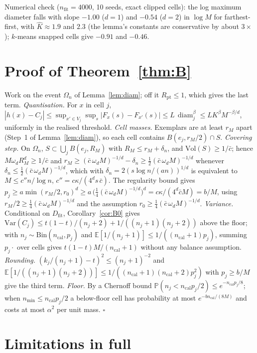 \documentclass[twoside]{article}
\theoremstyle{definition}
\theoremstyle{remark}
\newcommand{\Dfit}{D_{\mathrm{fit}}}
\newcommand{\E}{\mathbb{E}}
\renewcommand{\P}{\mathbb{P}}
\newcommand{\1}{\mathbf{1}}
\DeclareMathOperator{\diam}{diam}
\begin{document}
Numerical check ($n_{\mathrm{fit}}=4000$, 10 seeds, exact clipped
cells): the log maximum diameter falls with slope $-1.00$ ($d=1$) and $-0.54$ ($d=2$) in $\log M$
for farthest-first, with $\hat K\approx1.9$ and $2.3$ (the lemma's constants are conservative by
about $3\times$); $k$-means snapped cells give $-0.91$ and $-0.46$.

\section{Proof of Theorem~\ref{thm:B}}
\label{app:thmB}
Work on the event $\Omega_n$ of Lemma~\ref{lem:diam}; off it $R_{\mathrm{pt}}\le1$, which gives the last
term. \emph{Quantisation.} For $x$ in cell $j$, $|h(x)-C_j|\le\sup_{x'\in V_j}\sup_s|F_x(s)-F_{x'}(s)|\le
L\,\diam_j^{\beta}\le L K^{\beta}M^{-\beta/d}$, uniformly in the realised threshold. \emph{Cell masses.}
Exemplars are at least $r_M$ apart (Step~1 of Lemma~\ref{lem:diam}), so each cell contains
$B(e_j,r_M/2)\cap S$. \emph{Covering step.} On $\Omega_n$, $S\subset\bigcup_j B(e_j,R_M)$ with
$R_M\le r_M+\delta_n$, and $\mathrm{Vol}(S)\ge1/\bar c$; hence $M\omega_d R_M^d\ge1/\bar c$ and
$r_M\ge(\bar c\,\omega_d M)^{-1/d}-\delta_n\ge\tfrac12(\bar c\,\omega_d M)^{-1/d}$ whenever
$\delta_n\le\tfrac12(\bar c\,\omega_d M)^{-1/d}$, which with $\delta_n=2(s\log n/(an))^{1/d}$ is
equivalent to $M\le c''n/\log n$, $c''=c\kappa/(4^d s\,\bar c)$. The regularity bound gives
$p_j\ge a\min(r_M/2,r_0)^d\ge a\,\big(\tfrac14(\bar c\,\omega_dM)^{-1/d}\big)^d=c\kappa/(4^d\bar c M)=b/M$,
using $r_M/2\ge\tfrac14(\bar c\,\omega_dM)^{-1/d}$ and the assumption $r_0\ge\tfrac14(\bar c\,\omega_dM)^{-1/d}$. \emph{Variance.} Conditional on $\Dfit$, Corollary~\ref{cor:B0} gives
$\mathrm{Var}(C_j)\le t(1-t)/(n_j+2)+1/((n_j+1)(n_j+2))$ above the floor; with
$n_j\sim\mathrm{Bin}(n_{\mathrm{cal}},p_j)$ and $\E[1/(n_j+1)]\le1/((n_{\mathrm{cal}}+1)p_j)$, summing
$p_j\cdot$ over cells gives $t(1-t)M/(n_{\mathrm{cal}}+1)$ without any balance assumption.
\emph{Rounding.} $(k_j/(n_j+1)-t)^2\le(n_j+1)^{-2}$ and
$\E[1/((n_j+1)(n_j+2))]\le1/((n_{\mathrm{cal}}+1)(n_{\mathrm{cal}}+2)p_j^2)$ with $p_j\ge b/M$ give the
third term. \emph{Floor.} By a Chernoff bound $\P(n_j<n_{\mathrm{cal}}p_j/2)\le e^{-n_{\mathrm{cal}}p_j/8}$;
when $n_{\min}\le n_{\mathrm{cal}}p_j/2$ a below-floor cell has probability at most
$e^{-b n_{\mathrm{cal}}/(8M)}$ and costs at most $\alpha^2$ per unit mass. \hfill$\square$

\section{Limitations in full}
\label{app:limitations}
\end{document}
